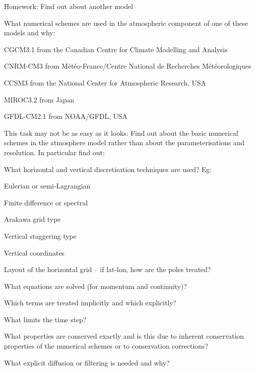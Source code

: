 \begin{slide}{Homework: Find out about another model}

What numerical schemes are used in the atmospheric component of one of these models and why:

\begin{list0}

\item CGCM3.1 from the Canadian Centre for Climate Modelling and Analysis

\item CNRM-CM3 from M\'et\'eo-France/Centre National de Recherches M\'et\'eorologiques

\item CCSM3 from the National Center for Atmospheric Research, USA

\item MIROC3.2 from Japan

\item GFDL-CM2.1 from NOAA/GFDL, USA

This task may not be as easy as it looks. Find out about the basic numerical schemes in the atmosphere model rather than about the parameterisations and resolution. In particular find out:

\begin{list1}
\item What horizontal and vertical discretisation techniques are used? Eg:
\begin{list2}
    \item Eulerian or semi-Lagrangian
    \item Finite difference or spectral
    \item Arakawa grid type
    \item Vertical staggering type
    \item Vertical coordinates
    \item Layout of the horizontal grid -- if lat-lon, how are the poles treated?
\end{list2}

\item What equations are solved (for momentum and continuity)?
\item Which terms are treated implicitly and which explicitly?
\item What limits the time step?
\item What properties are conserved exactly and is this due to inherent conservation properties of the numerical schemes or to conservation corrections?
\item What explicit diffusion or filtering is needed and why?
\end{list1}
\end{list0}

\end{slide}
